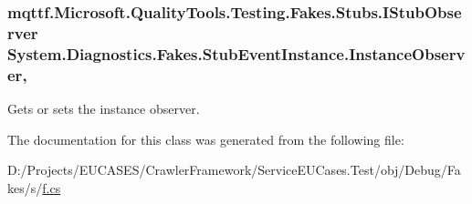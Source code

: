 \hypertarget{class_system_1_1_diagnostics_1_1_fakes_1_1_stub_event_instance_acb122c3c36b428eb1cb7cf7790271734}{
\subsubsection[{Instance\-Observer}]{\setlength{\rightskip}{0pt plus 5cm}mqttf.\-Microsoft.\-Quality\-Tools.\-Testing.\-Fakes.\-Stubs.\-I\-Stub\-Observer System.\-Diagnostics.\-Fakes.\-Stub\-Event\-Instance.\-Instance\-Observer\hspace{0.3cm}{\ttfamily [get]}, {\ttfamily [set]}}}\label{class_system_1_1_diagnostics_1_1_fakes_1_1_stub_event_instance_acb122c3c36b428eb1cb7cf7790271734}


Gets or sets the instance observer.



The documentation for this class was generated from the following file\-:\begin{DoxyCompactItemize}
\item 
D\-:/\-Projects/\-E\-U\-C\-A\-S\-E\-S/\-Crawler\-Framework/\-Service\-E\-U\-Cases.\-Test/obj/\-Debug/\-Fakes/s/\hyperlink{s_2f_8cs}{f.\-cs}\end{DoxyCompactItemize}
